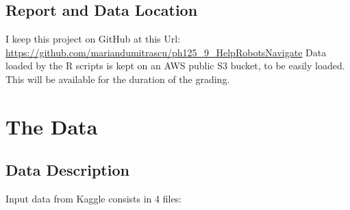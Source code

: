 \documentclass[]{article}
\begin{document}
\hypertarget{report-and-data-location}{%
\subsection{Report and Data Location}\label{report-and-data-location}}

I keep this project on GitHub at this Url:
\url{https://github.com/mariandumitrascu/ph125_9_HelpRobotsNavigate}
Data loaded by the R scripts is kept on an AWS public S3 bucket, to be
easily loaded. This will be available for the duration of the grading.

\hypertarget{the-data}{%
\section{The Data}\label{the-data}}

\hypertarget{data-description}{%
\subsection{Data Description}\label{data-description}}

Input data from Kaggle consists in 4 files:
\end{document}
